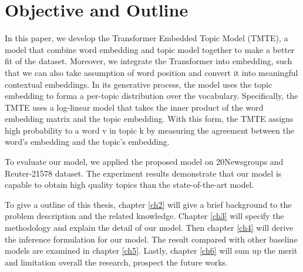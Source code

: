 \section{Objective and Outline}
In this paper, we develop the Transformer Embedded Topic Model (TMTE), a model that combine word embedding and topic model together to make a better fit of the dataset. Moreover, we integrate the Transformer into embedding, such that we can also take assumption of word position and convert it into meaningful contextual embeddings. 
In its generative process, the model uses the topic embedding to forma a per-topic distribution over the vocabulary. Specifically, the TMTE uses a log-linear model that takes the inner product of the word embedding matrix and the topic embedding.
With this form, the TMTE assigns high probability to a word v in topic k by measuring the agreement between the word’s embedding and the topic’s embedding.

To evaluate our model, we applied the proposed model on 20Newsgroups and Reuter-21578 dataset. The experiment results demonstrate that our model is capable to obtain high quality topics than the state-of-the-art model. 

To give a outline of this thesis, chapter \ref{ch2} will give a brief background to the problem description and the related knowledge. Chapter \ref{ch3} will specify the methodology and explain the detail of our model. Then chapter \ref{ch4} will derive the inference formulation for our model. The result compared with other baseline models are examined in chapter \ref{ch5}. Lastly, chapter \ref{ch6} will sum up the merit and limitation overall the research, prospect the future works.
